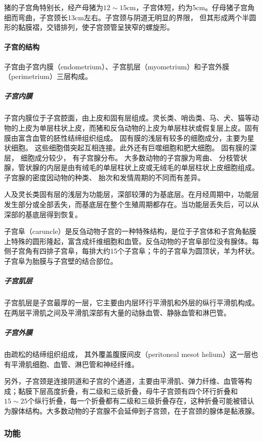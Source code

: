 猪的子宫角特别长，经产母猪为$ 12\sim 15 $cm，子宫体短，约为5cm。仔母猪子宫角细而弯曲，子宫颈长13cm左右。子宫颈与阴道无明显的界限， 但其形成两个半圆形的黏膜褶，交错排列，使子宫颈管呈狭窄的螺旋形。

\paragraph{子宫的结构}

子宫由子宫内膜（endometrium）、子宫肌层（myometrium）和子宫外膜 （perimetrium）三层构成。

\subparagraph{子宫内膜}

子宫内膜位于子宫腔面，由上皮和固有层组成。灵长类、哨齿类、马、犬、猫等动物的上皮为单层柱状上皮，而猪和反刍动物的上皮为单层柱状或假复层上皮。固有膜由富含血管的胚性结缔组织组成。 固有膜的浅层有较多的细胞成分，主要为星状细胞。 这些细胞借突起互相连接。此外还有巨噬细胞和肥大细胞。 固有膜的深层， 细胞成分较少， 有子宫腺分布。 大多数动物的子宫腺为弯曲、 分枝管状腺，管状腺的内层是由有绒毛的单层柱状上皮或无绒毛的单层柱状上皮细胞组成。子宫腺的密度因动物的种类、 胎次和发情周期的不同而有差异。

人及灵长类固有层的浅层为功能层，深部较薄的为基底层。在月经周期中，功能层发生部分或全部丢失，而基底层在整个生殖周期都存在。当功能层丢失后，可以从深部的基底层得到恢复。

子宫阜（caruncle）是反刍动物子宫的一种特殊结构，是位于子宫体和子宫角黏膜上特殊的圆形隆起，富含成纤维细胞和血管。反刍动物的子宫阜部位没有腺体。每侧子宫角有四排子宫阜，每排大约15个子宫阜；牛的子宫阜为圆顶状，羊为杯状。子宫阜为胎膜与子宫壁的结合部位。

\subparagraph{子宫肌层}

子宫肌层是子宫最厚的一层，它主要由内层环行平滑肌和外层的纵行平滑肌构成。在两层平滑肌之间及平滑肌深部有大量的动脉血管、静脉血管和淋巴管。

\subparagraph{子宫外膜}
由疏松的结缔组织组成， 其外覆盖腹膜间皮（peritoneal mesot helium）这一层也有平滑肌细胞、血管、淋巴管和神经纤维。

另外，子宫颈是连接阴道和子宫的个通道，主要由平滑肌、弹力纤维、血管等构成；黏膜下层高度折叠，有二级和三级折叠，母牛子宫颈有四个环行折叠和$ 15\sim 25 $个纵行折叠，每一个折叠都有二级和三级折叠存在，这种折叠可能被错认为腺体结构。大多数动物的子宫腺不会延伸到子宫颈，在子宫颈的腺体是黏液腺。

\subsubsection{功能}

